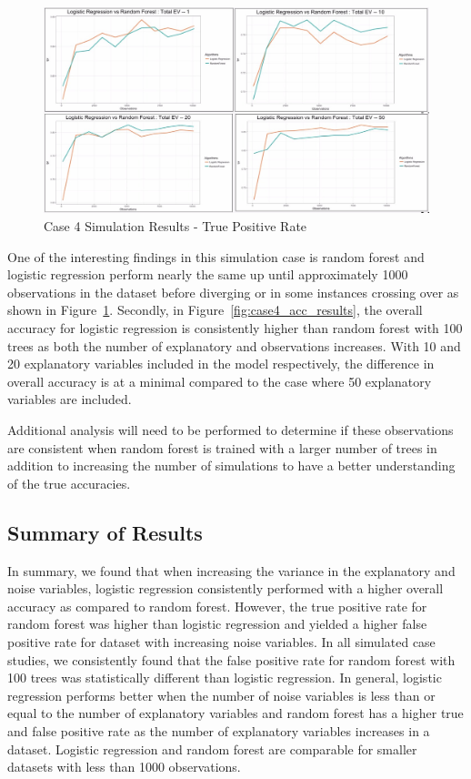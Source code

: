 \documentclass{llncs}
\begin{document}
\begin{figure}
\centering
\includegraphics[scale=0.55]{case4_tpr.png}
\caption{Case 4 Simulation Results - True Positive Rate}
\label{fig:case4_tpr_results}
\end{figure}

One of the interesting findings in this simulation case is random forest and logistic regression perform nearly the same up until approximately 1000 observations in the dataset before diverging or in some instances crossing over as shown in Figure~\ref{fig:case4_tpr_results}. Secondly, in Figure~\ref{fig:case4_acc_results}, the overall accuracy for logistic regression is consistently higher than random forest with 100 trees as both the number of explanatory and observations increases. With 10 and 20 explanatory variables included in the model respectively, the difference in overall accuracy is at a minimal compared to the case where 50 explanatory variables are included. 

Additional analysis will need to be performed to determine if these observations are consistent when random forest is trained with a larger number of trees in addition to increasing the number of simulations to have a better understanding of the true accuracies.

\subsection{Summary of Results}
In summary, we found that when increasing the variance in the explanatory and noise variables, logistic regression consistently performed with a higher overall accuracy as compared to random forest. However, the true positive rate for random forest was higher than logistic regression and yielded a higher false positive rate for dataset with increasing noise variables. In all simulated case studies, we consistently found that the false positive rate for random forest with 100 trees was statistically different than logistic regression. In general, logistic regression performs better when the number of noise variables is less than or equal to the number of explanatory variables and random forest has a higher true and false positive rate as the number of explanatory variables increases in a dataset.  Logistic regression and random forest are comparable for smaller datasets with less than 1000 observations.
\end{document}
